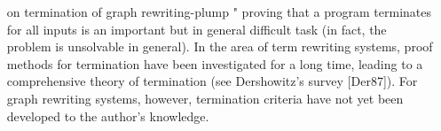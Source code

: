 \begin{itemize}
    \item[on termination of graph rewriting-plump] " proving that a program terminates for all inputs is an important but in general difficult task (in fact, the problem is unsolvable in general). In the area of term rewriting systems, proof methods for termination have been investigated for a long time, leading to a comprehensive theory of termination (see Dershowitz's survey [Der87]). For graph rewriting systems, however, termination criteria have not yet been developed to the author's knowledge.
\end{itemize}